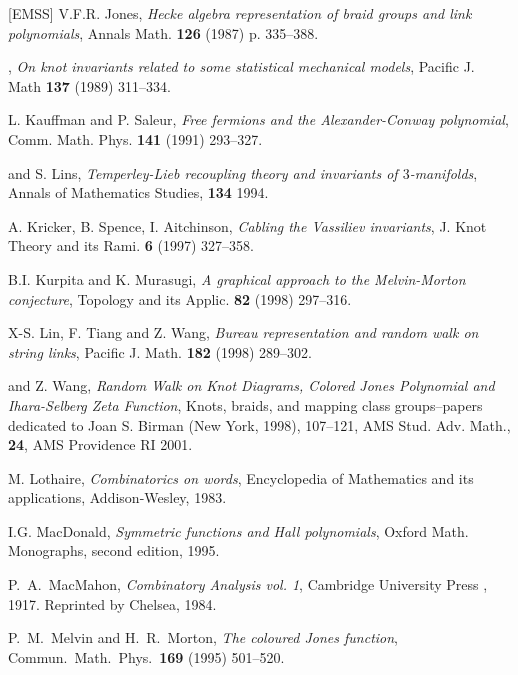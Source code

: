 \documentclass{amsart}
\theoremstyle{plain}
\theoremstyle{definition}
\theoremstyle{remark}
\begin{document}
\begin{thebibliography}{[EMSS]}
 V.F.R. Jones,
        {\em Hecke algebra representation of braid groups and link
        polynomials}, 
        Annals Math. {\bf 126} (1987) p. 335--388.

 \bysame,
        {\em On knot invariants related to some statistical mechanical
        models},
        Pacific J. Math {\bf 137} (1989) 311--334.

 L. Kauffman and P. Saleur,
        {\em Free fermions and the Alexander-Conway polynomial}, 
        Comm. Math. Phys. {\bf 141} (1991) 293--327.

 \bysame and S. Lins,
        {\em  Temperley-Lieb recoupling theory and invariants of 
        $3$-manifolds},
        Annals of Mathematics Studies, {\bf 134} 1994.

 A. Kricker, B. Spence, I. Aitchinson,
        {\em Cabling the Vassiliev invariants}, 
        J. Knot Theory and its Rami. {\bf 6} (1997) 327--358.

 B.I. Kurpita and K. Murasugi,
        {\em A graphical approach to the Melvin-Morton conjecture},
        Topology and its Applic. {\bf 82} (1998) 297--316.
 
 X-S. Lin, F. Tiang and Z. Wang,
        {\em Bureau representation and random walk on string links},
        Pacific J. Math. {\bf 182} (1998) 289--302.
 
 \bysame and Z. Wang,
        {\em Random Walk on Knot Diagrams, Colored Jones Polynomial
        and Ihara-Selberg Zeta Function},
        Knots, braids, and mapping class groups--papers dedicated to 
        Joan S. Birman (New York, 1998),  107--121, 
        AMS Stud. Adv. Math., {\bf 24}, AMS Providence RI 2001.
        
 M. Lothaire,
        {\em Combinatorics on words},
        Encyclopedia of Mathematics and its applications, Addison-Wesley, 1983.

 I.G. MacDonald,
        {\em Symmetric functions and Hall polynomials},
        Oxford Math. Monographs, second edition, 1995.

 P.~A.~MacMahon, 
        {\em Combinatory Analysis vol. 1},
        Cambridge University Press , 1917. Reprinted by Chelsea, 1984.

 P.~M.~Melvin and H.~R.~Morton,
        {\em The coloured Jones function},
        Commun.\ Math.\ Phys.\ {\bf 169} (1995) 501--520.


\end{thebibliography}
\end{document}
